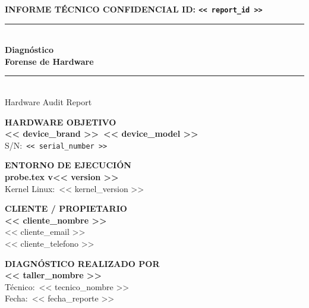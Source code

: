 \documentclass[11pt, a4paper, final]{article}
\begin{document}
\thispagestyle{empty}

\noindent
{\color{AMSlate}\scriptsize\bfseries\MakeUppercase{Informe Técnico Confidencial} \hfill ID: \texttt{<< report_id >>}}\\[1ex]
{\color{AMPrimary}\rule{\linewidth}{1.5pt}}\\[4ex]

\noindent
{\color{black}\fontsize{42}{48}\selectfont\bfseries Diagnóstico}\\[1ex]
{\color{black}\fontsize{42}{48}\selectfont\bfseries Forense de Hardware} {\color{StatusCrit}\rule{14pt}{14pt}}\\[3ex]
{\color{AMSlate}\Large Hardware Audit Report}

\vspace{2.5cm}

\noindent
\begin{minipage}[t]{0.5\textwidth}
  {\scriptsize\bfseries\color{AMSlate}HARDWARE OBJETIVO}\\[1ex]
  {\Large\bfseries\color{AMPrimary}<< device_brand >>\ << device_model >>}\\[1ex]
  {\small\color{AMSlate}S/N:\ \texttt{<< serial_number >>}}
\end{minipage}%
\begin{minipage}[t]{0.5\textwidth}
  {\scriptsize\bfseries\color{AMSlate}ENTORNO DE EJECUCIÓN}\\[1ex]
  {\normalsize\bfseries\color{AMPrimary}probe\textcolor{redtex}{.tex} v<< version >>}\\[1ex]
  {\small\color{AMSlate}Kernel Linux:\ << kernel_version >>}
\end{minipage}

\vspace{1.5cm}

\noindent
\begin{minipage}[t]{0.5\textwidth}
  {\scriptsize\bfseries\color{AMSlate}CLIENTE / PROPIETARIO}\\[1ex]
  {\normalsize\bfseries\color{AMPrimary}<< cliente_nombre >>}\\[1ex]
  {\small\color{AMSlate}<< cliente_email >>}\\[0.5ex]
  {\small\color{AMSlate}<< cliente_telefono >>}
\end{minipage}%
\begin{minipage}[t]{0.5\textwidth}
  {\scriptsize\bfseries\color{AMSlate}DIAGNÓSTICO REALIZADO POR}\\[1ex]
  {\normalsize\bfseries\color{AMPrimary}<< taller_nombre >>}\\[1ex]
  {\small\color{AMSlate}Técnico:\ << tecnico_nombre >>}\\[0.5ex]
  {\small\color{AMSlate}Fecha:\ << fecha_reporte >>}
\end{minipage}
\end{document}
